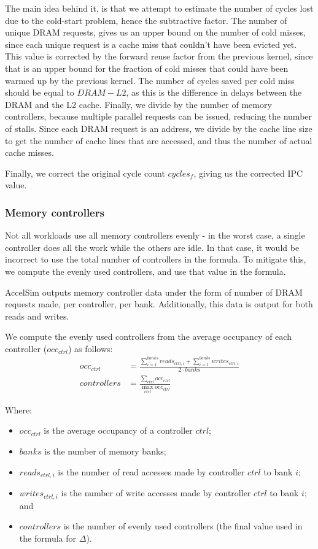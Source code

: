 The main idea behind it, is that we attempt to estimate the number of cycles lost due to the cold-start problem, hence the subtractive factor.
The number of unique DRAM requests, gives us an upper bound on the number of cold misses, since each unique request is a cache miss that couldn't have been evicted yet.
This value is corrected by the forward reuse factor from the previous kernel, since that is an upper bound for the fraction of cold misses that could have been warmed up by the previous kernel.
The number of cycles saved per cold miss should be equal to $DRAM - L2$, as this is the difference in delays between the DRAM and the L2 cache.
Finally, we divide by the number of memory controllers, because multiple parallel requests can be issued, reducing the number of stalls.
Since each DRAM request is an address, we divide by the cache line size to get the number of cache lines that are accessed, and thus the number of actual cache misses.

Finally, we correct the original cycle count $cycles_f$, giving us the corrected IPC value.

\subsubsection{Memory controllers}\label{subsubsec:mem-ctrl}
Not all workloads use all memory controllers evenly - in the worst case, a single controller does all the work while the others are idle.
In that case, it would be incorrect to use the total number of controllers in the formula.
To mitigate this, we compute the evenly used controllers, and use that value in the formula.

AccelSim outputs memory controller data under the form of number of DRAM requests made, per controller, per bank.
Additionally, this data is output for both reads and writes.

We compute the evenly used controllers from the average occupancy of each controller ($occ_{ctrl}$) as follows:
\begin{align}
    occ_{ctrl} &= \frac{\sum_{i = 1}^{banks}{reads_{ctrl, i}} + \sum_{i = 1}^{banks}{writes_{ctrl, i}}}{2 \cdot banks} \\
    controllers &= \frac{\sum_{ctrl}{occ_{ctrl}}}{\max_{ctrl}{occ_{ctrl}}}
\end{align}

Where:
\begin{itemize}
    \item $occ_{ctrl}$ is the average occupancy of a controller $ctrl$;
    \item $banks$ is the number of memory banks;
    \item $reads_{ctrl, i}$ is the number of read accesses made by controller $ctrl$ to bank $i$;
    \item $writes_{ctrl, i}$ is the number of write accesses made by controller $ctrl$ to bank $i$; and
    \item $controllers$ is the number of evenly used controllers (the final value used in the formula for $\Delta$).
\end{itemize}

